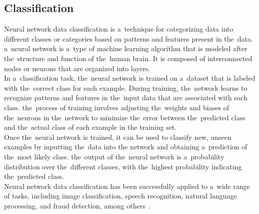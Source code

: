 \subsection{Classification} \label{subsec:clasification}
Neural network data classification is a~technique for categorizing data into different classes or categories based on
patterns and features present in the~data. a~neural network is a~type of machine learning algorithm that is modeled
after the~structure and function of the~human brain. It is composed of interconnected nodes or neurons that are
organized into layers.\\
In a~classification task, the~neural network is trained on a~dataset that is labeled with the~correct
class for each example. During training, the~network learns to recognize patterns and features in the~input data
that are associated with each class. the~process of training involves adjusting the~weights and biases of the~neurons
in the~network to minimize the~error between the~predicted class and the~actual class of each example in the
training set.\\
Once the~neural network is trained, it can be used to classify new, unseen examples by inputting the~data into
the network and obtaining a~prediction of the~most likely class. the~output of the~neural network is a~probability
distribution over the~different classes, with the~highest probability indicating the~predicted class.\\
Neural network data classification has been successfully applied to a~wide range of tasks, including image
classification, speech recognition, natural language processing, and fraud detection, among others~\cite{feraud2002methodology}.

